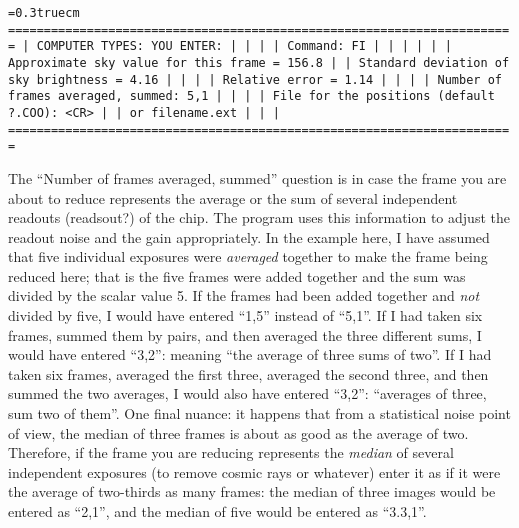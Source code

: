 \bigskip
{\noindent\obeylines\obeyspaces\frenchspacing\tt\baselineskip=0.3truecm
=======================================================================
| COMPUTER TYPES:                                      YOU ENTER:     |
|                                                                     |
| Command:                                             FI             |
|                                                                     |
|                                                                     |
|   Approximate sky value for this frame =   156.8                    |
|   Standard deviation of sky brightness =     4.16                   |
|                                                                     |
|                        Relative error = 1.14                        |
|                                                                     |
|        Number of frames averaged, summed:            5,1            |
|                                                                     |
|   File for the positions (default ?.COO):            <CR>           |
|                                                   or filename.ext   |
|                                                                     |
=======================================================================
}
\bigskip

\noindent The ``Number of frames averaged, summed'' question is in case
the frame you are about to reduce represents the average or the sum of
several independent readouts (readsout?) of the chip.  The program uses
this information to adjust the readout noise and the gain
appropriately.  In the example here, I have assumed that five
individual exposures were {\it averaged\/} together to make the frame
being reduced here; that is the five frames were added together and the
sum was divided by the scalar value 5.  If the frames had been added
together and {\it not\/} divided by five, I would have entered ``1,5''
instead of ``5,1''.  If I had taken six frames, summed them by pairs,
and then averaged the three different sums, I would have entered
``3,2'': meaning ``the average of three sums of two''.  If I had taken
six frames, averaged the first three, averaged the second three, and
then summed the two averages, I would also have entered ``3,2'':
``averages of three, sum two of them''.  One final nuance:  it happens
that from a statistical noise point of view, the median of three frames
is about as good as the average of two.  Therefore, if the frame you
are reducing represents the {\it median\/} of several independent
exposures (to remove cosmic rays or whatever) enter it as if it were
the average of two-thirds as many frames:  the median of three images
would be entered as ``2,1'', and the median of five would be entered as
``3.3,1''.

